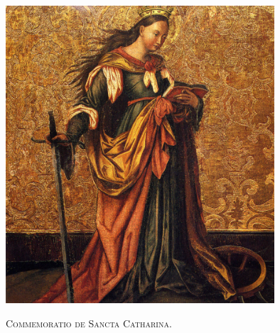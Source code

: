 \documentclass[12pt]{article} %
\begin{document}
\pagestyle{empty}

\begin{center}

	\includegraphics[width=10cm]{st-catherine-of-alexandria.jpg}
	
	\vspace*{5.0mm}

	\begin{Large}\textsc{\textcolor{benred8}{Commemoratio de Sancta Catharina.}}\end{Large}

\end{center}


\def\greinitialformat#1{%
{\fontsize{43}{43}\selectfont #1}%
}

\def\grebiginitialformat#1{%
{\fontsize{120}{120}\selectfont #1}%
}


\end{document}
